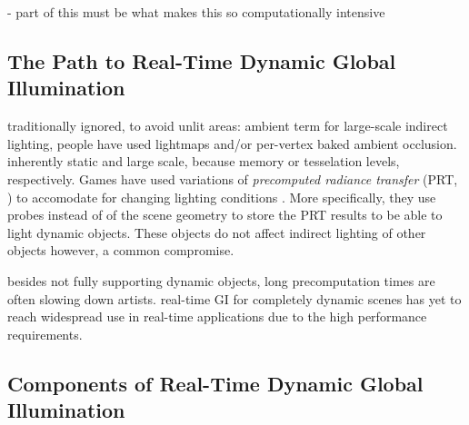 - part of this must be what makes this so computationally intensive


\subsection{The Path to Real-Time Dynamic Global Illumination}

\begin{outline}
\1 traditionally ignored, to avoid unlit areas: ambient term
\1 for large-scale indirect lighting, people have used lightmaps and/or per-vertex baked ambient occlusion. inherently static and large scale, because memory or tesselation levels, respectively.
\1 Games have used variations of \emph{precomputed radiance transfer} (PRT, \cite{sloan:2002:PRT}) to accomodate for changing lighting conditions \cite{stefanov:2012:PRTinFarCry3}. More specifically, they use probes instead of of the scene geometry to store the PRT results to be able to light dynamic objects. These objects do not affect indirect lighting of other objects however, a common compromise.

\1 besides not fully supporting dynamic objects, long precomputation times are often slowing down artists.
\1 real-time GI for completely dynamic scenes has yet to reach widespread use in real-time applications due to the high performance requirements.
\end{outline}


\subsection{Components of Real-Time Dynamic Global Illumination}
\label{sec:componentsOfGI}

